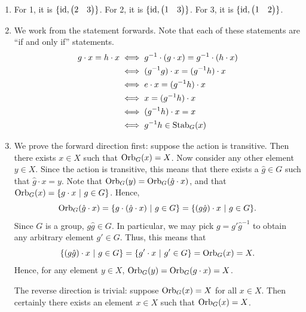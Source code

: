 \begin{enumerate}
    \item For 1, it is $\{\mathrm{id}, \begin{pmatrix}2 & 3\end{pmatrix}\}$. For 2, it is $\{\mathrm{id}, \begin{pmatrix}1 & 3\end{pmatrix}\}$. For 3, it is $\{\mathrm{id}, \begin{pmatrix}1 & 2\end{pmatrix}\}$.

    \item We work from the statement forwards. Note that each of these statements are ``if and only if'' statements.
    \begin{align*}
	    g \cdot x = h \cdot x &\iff g^{-1} \cdot (g \cdot x) = g^{-1} \cdot (h \cdot x)\\
	    &\iff (g^{-1}g) \cdot x = (g^{-1}h) \cdot x\\
	    &\iff e \cdot x = (g^{-1}h) \cdot x\\
	    &\iff x = (g^{-1}h) \cdot x\\
	    &\iff (g^{-1}h) \cdot x = x\\
	    &\iff g^{-1}h \in \mathrm{Stab}_{G}(x)
	\end{align*}

	\item We prove the forward direction first: suppose the action is transitive. Then there exists $x \in X$ such that $\mathrm{Orb}_{G}(x) = X$. Now consider any other element $y \in X$. Since the action is transitive, this means that there exists a $\hat{g} \in G$ such that $\hat{g} \cdot x = y$. Note that $\mathrm{Orb}_{G}(y) = \mathrm{Orb}_{G}(\hat{g} \cdot x)$, and that $\mathrm{Orb}_{G}(x) = \{g \cdot x \ | \  g \in G\}$. Hence,
	\[
        \mathrm{Orb}_{G}(\hat{g} \cdot x) = \{g\cdot (\hat{g} \cdot x) \ | \  g \in G\} = \{(g\hat{g}) \cdot x \ | \  g \in G\}.
	\]
	Since $G$ is a group, $g\hat{g} \in G$. In particular, we may pick $g = g'\hat{g}^{-1}$ to obtain any arbitrary element $g' \in G$. Thus, this means that
	\[
        	\{(g\hat{g}) \cdot x \ | \  g \in G\} = \{g' \cdot x \ | \  g' \in G \} = \mathrm{Orb}_{G}(x) = X.
	\]
	Hence, for any element $y \in X$, $\mathrm{Orb}_{G}(y) = \mathrm{Orb}_{G}(g \cdot x) = X$.

	The reverse direction is trivial: suppose $\mathrm{Orb}_{G}(x) = X$ for all $x \in X$. Then certainly there exists an element $x \in X$ such that $\mathrm{Orb}_{G}(x) = X$.


\end{enumerate}
